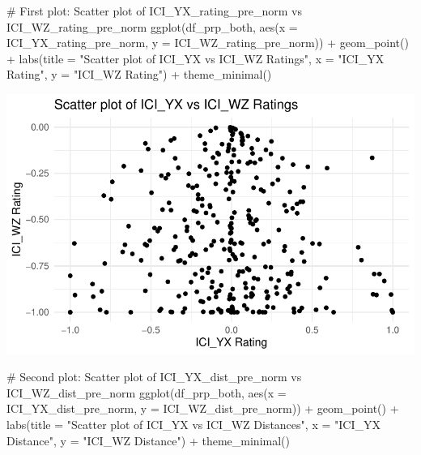 \documentclass[
  letterpaper,
  DIV=11,
  numbers=noendperiod]{scrartcl}
\newenvironment{Shaded}{\begin{snugshade}}{\end{snugshade}}
\newcommand{\AttributeTok}[1]{\textcolor[rgb]{0.40,0.45,0.13}{#1}}
\newcommand{\CommentTok}[1]{\textcolor[rgb]{0.37,0.37,0.37}{#1}}
\newcommand{\FunctionTok}[1]{\textcolor[rgb]{0.28,0.35,0.67}{#1}}
\newcommand{\NormalTok}[1]{\textcolor[rgb]{0.00,0.23,0.31}{#1}}
\newcommand{\SpecialCharTok}[1]{\textcolor[rgb]{0.37,0.37,0.37}{#1}}
\newcommand{\StringTok}[1]{\textcolor[rgb]{0.13,0.47,0.30}{#1}}
\begin{document}
\begin{Shaded}
\begin{Highlighting}[]
\CommentTok{\# First plot: Scatter plot of ICI\_YX\_rating\_pre\_norm vs ICI\_WZ\_rating\_pre\_norm}
\FunctionTok{ggplot}\NormalTok{(df\_prp\_both, }\FunctionTok{aes}\NormalTok{(}\AttributeTok{x =}\NormalTok{ ICI\_YX\_rating\_pre\_norm, }\AttributeTok{y =}\NormalTok{ ICI\_WZ\_rating\_pre\_norm)) }\SpecialCharTok{+}
  \FunctionTok{geom\_point}\NormalTok{() }\SpecialCharTok{+}
  \FunctionTok{labs}\NormalTok{(}\AttributeTok{title =} \StringTok{"Scatter plot of ICI\_YX vs ICI\_WZ Ratings"}\NormalTok{,}
       \AttributeTok{x =} \StringTok{"ICI\_YX Rating"}\NormalTok{,}
       \AttributeTok{y =} \StringTok{"ICI\_WZ Rating"}\NormalTok{) }\SpecialCharTok{+}
  \FunctionTok{theme\_minimal}\NormalTok{()}
\end{Highlighting}
\end{Shaded}

\includegraphics{index_files/figure-pdf/unnamed-chunk-21-1.pdf}

\begin{Shaded}
\begin{Highlighting}[]
\CommentTok{\# Second plot: Scatter plot of ICI\_YX\_dist\_pre\_norm vs ICI\_WZ\_dist\_pre\_norm}
\FunctionTok{ggplot}\NormalTok{(df\_prp\_both, }\FunctionTok{aes}\NormalTok{(}\AttributeTok{x =}\NormalTok{ ICI\_YX\_dist\_pre\_norm, }\AttributeTok{y =}\NormalTok{ ICI\_WZ\_dist\_pre\_norm)) }\SpecialCharTok{+}
  \FunctionTok{geom\_point}\NormalTok{() }\SpecialCharTok{+}
  \FunctionTok{labs}\NormalTok{(}\AttributeTok{title =} \StringTok{"Scatter plot of ICI\_YX vs ICI\_WZ Distances"}\NormalTok{,}
       \AttributeTok{x =} \StringTok{"ICI\_YX Distance"}\NormalTok{,}
       \AttributeTok{y =} \StringTok{"ICI\_WZ Distance"}\NormalTok{) }\SpecialCharTok{+}
  \FunctionTok{theme\_minimal}\NormalTok{()}
\end{Highlighting}
\end{Shaded}
\end{document}
